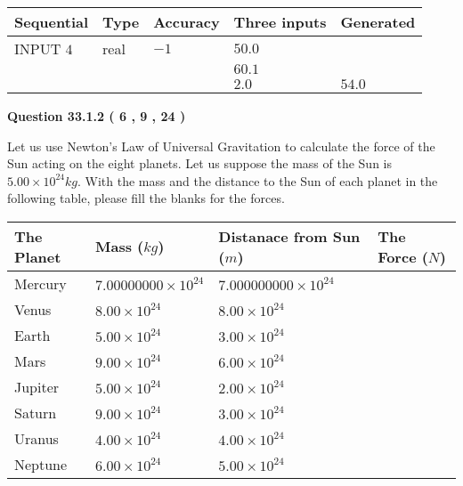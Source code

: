 \documentclass[12pt]{article}
\begin{document}
   
  
  
\noindent\begin{tabular}{|l|l|l|l|l|}
\hline
 Sequential & Type & Accuracy & Three inputs & Generated \\ 
\hline
 
 
  INPUT $            4 $ & real & $           -1  $ & $
 50.0
  $ & \\
  & & &  $
 60.1
  $ & \\
  & & &  $
 2.0
 $ & $ 54.0 $ 
 \\  \hline  
 \end{tabular}
   
   
  
\vspace{0.2in}
  
{\textbf{\Large{Question
33.1.2 
 (           6 ,           9 ,          24 )
}}}
  
  
Let us use Newton's Law of Universal Gravitation to calculate the force
of the Sun acting on the eight planets. Let us suppose the mass of the
Sun is $ %
5.00 \times 10^{24} kg$. With the mass and the
distance to the Sun of each planet in the following table, please fill
the blanks for the forces.
 
\vspace{0.2in}
 
 
\begin{tabular}{|l|l|l|l|}
\hline
The Planet & Mass ($kg$) & Distanace from Sun ($m$) & The Force ($N$)\\
\hline
Mercury  &
           $ %
7.00000000 \times 10^{24} $   &
             $ %
7.000000000 \times 10^{24} $    &
\\  \hline
Venus    &
           $ %
8.00 \times 10^{24} $    &
             $ %
8.00 \times 10^{24} $    &
\\  \hline
Earth    &
           $ %
5.00 \times 10^{24} $    &
             $ %
3.00 \times 10^{24} $    &
\\   \hline
Mars     &
           $ %
9.00 \times 10^{24} $    &
             $ %
6.00 \times 10^{24} $    &
\\   \hline
Jupiter  &
           $ %
5.00 \times 10^{24} $    &
             $ %
2.00 \times 10^{24} $    &
\\  \hline
Saturn   &
           $ %
9.00 \times 10^{24}$    &
             $ %
3.00 \times 10^{24}$    &
\\  \hline
Uranus   &
           $ %
4.00 \times 10^{24} $    &
             $ %
4.00 \times 10^{24} $    &
\\  \hline
Neptune  &
           $ %
6.00 \times 10^{24} $    &
             $ %
5.00 \times 10^{24} $    &
\\  \hline
 
\end{tabular}
 
\end{document}

